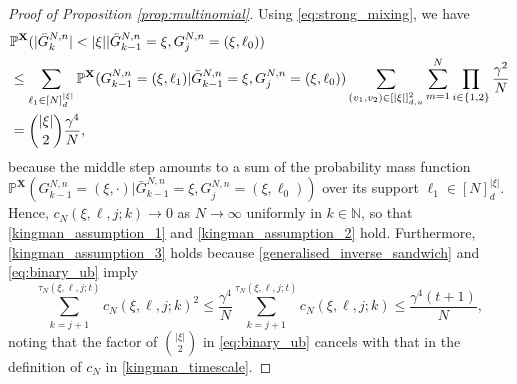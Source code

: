 \documentclass[a4paper,11pt]{article}
\theoremstyle{definition}
\newcommand{\bbP}{\mathbb{P}}
\newcommand{\bbN}{\mathbb{N}}
\newcommand{\bfX}{\mathbf{X}}
\begin{document}
\begin{proof}[Proof of Proposition \ref{prop:multinomial}]
Using \eqref{eq:strong_mixing}, we have
\begin{align}
&\bbP^{ \bfX }( | \bar{ G }_k^{ N, n } | < | \xi | | \bar{ G }_{ k - 1 }^{ N, n } = \xi, G_j^{ N, n } = ( \xi, \ell_0 ) ) \notag \\
&\leq \sum_{ \ell_1 \in [ N ]_d^{ | \xi | } } \bbP^{ \bfX }( G_{ k - 1 }^{ N, n } = ( \xi, \ell_1 ) | \bar{ G }_{ k - 1 }^{ N, n } = \xi, G_j^{ N, n } = ( \xi, \ell_0 ) ) \sum_{ ( v_1, v_2 ) \in [ | \xi | ]_{ d, u }^2 } \sum_{ m = 1 }^N\prod_{ i \in \{ 1, 2 \} } \frac{ \gamma^2 }{ N } \notag \\
&= \binom{ | \xi | }{ 2 } \frac{ \gamma^4 }{ N }, \label{eq:binary_ub}
\end{align}
because the middle step amounts to a sum of the probability mass function $\bbP^{ \bfX }( G_{ k - 1 }^{ N, n } = ( \xi, \cdot ) | \bar{ G }_{ k - 1 }^{ N, n } = \xi, G_j^{ N, n } = ( \xi, \ell_0 ) )$ over its support $\ell_1 \in [ N ]_d^{ | \xi | }$.
Hence, $c_N( \xi, \ell, j; k ) \to 0$ as $N \to \infty$ uniformly in $k \in \bbN$, so that \eqref{kingman_assumption_1} and \eqref{kingman_assumption_2} hold.
Furthermore, \eqref{kingman_assumption_3} holds because \eqref{generalised_inverse_sandwich} and \eqref{eq:binary_ub} imply
\begin{equation*}
\sum_{ k = j + 1 }^{ \tau_N( \xi, \ell, j; t ) } c_N( \xi, \ell, j; k )^2 \leq \frac{ \gamma^4 }{ N } \sum_{ k = j + 1 }^{ \tau_N( \xi, \ell, j; t ) } c_N( \xi, \ell, j; k ) \leq \frac{ \gamma^4 ( t + 1 ) }{ N },
\end{equation*}
noting that the factor of $\binom{|\xi|}{2}$ in \eqref{eq:binary_ub} cancels with that in the definition of $c_N$ in \eqref{kingman_timescale}.


\end{proof}
\end{document}
